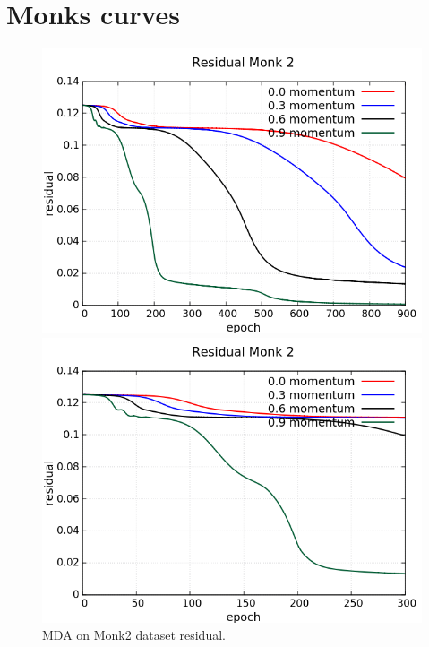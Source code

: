 \section{Monks curves}
\begin{figure}[H]
	\centering
	\begin{minipage}[t]{0.5\linewidth}
		\includegraphics[width=\linewidth]{data/MGD/Monk2/M/Monk2_MGD_Residual_standard.png}
	\end{minipage}%
	\begin{minipage}[t]{0.5\linewidth}
		\includegraphics[width=\linewidth]{data/MGD/Monk2/M/Monk2_MGD_Residual_zoom.png}
	\end{minipage}
	\caption{MDA on Monk2 dataset residual.}
\end{figure}
